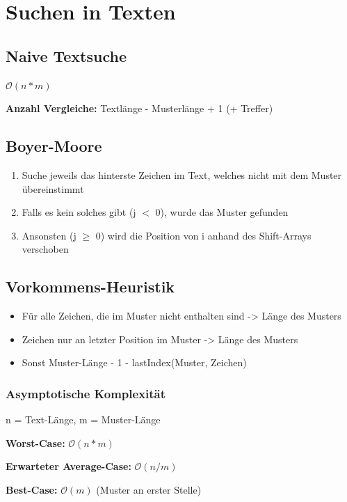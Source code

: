 \section*{Suchen in Texten}
\subsection*{Naive Textsuche}

$\mathcal{O}(n*m)$

\textbf{Anzahl Vergleiche:} Textlänge - Musterlänge + 1 (+ Treffer)

\subsection*{Boyer-Moore}

\begin{enumerate}
	\item Suche jeweils das hinterste Zeichen im Text, welches nicht mit dem Muster übereinstimmt
	\item Falls es kein solches gibt (j $<$ 0), wurde das Muster gefunden
	\item Ansonsten (j $\geq$ 0) wird die Position von i anhand des Shift-Arrays verschoben
\end{enumerate}

\subsection*{Vorkommens-Heuristik}

\begin{itemize}
	\item Für alle Zeichen, die im Muster nicht enthalten sind -> Länge des Musters
	\item Zeichen nur an letzter Position im Muster -> Länge des Musters
	\item Sonst Muster-Länge - 1 - lastIndex(Muster, Zeichen)
\end{itemize}

\subsubsection*{Asymptotische Komplexität}
n = Text-Länge, m = Muster-Länge

\textbf{Worst-Case:} $\mathcal{O}(n*m)$

\textbf{Erwarteter Average-Case:} $\mathcal{O}(n/m)$

\textbf{Best-Case:} $\mathcal{O}(m)$ (Muster an erster Stelle)

